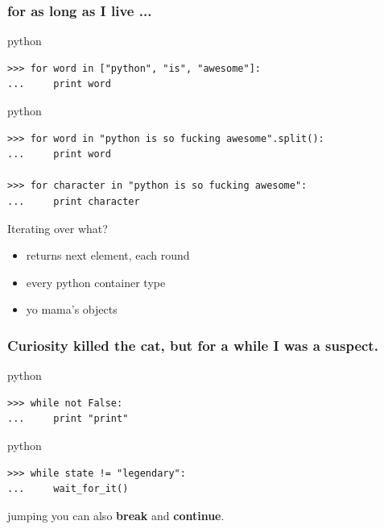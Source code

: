 \documentclass{beamer}
\begin{document}
\begin{frame}[fragile]
    \frametitle{\textbf{for} as long as I live ...}
    
    \begin{exampleblock}{python}
    \begin{lstlisting}
>>> for word in ["python", "is", "awesome"]:
...     print word
    \end{lstlisting}
    \end{exampleblock}

    \begin{exampleblock}{python}
    \begin{lstlisting}
>>> for word in "python is so fucking awesome".split():
...     print word

>>> for character in "python is so fucking awesome":
...     print character
    \end{lstlisting}
    \end{exampleblock}

	\pause

    \begin{block}{Iterating over what?}
    \begin{itemize}
    \item returns next element, each round
    \item every python container type
    \item yo mama's objects %
    \end{itemize}
    \end{block}
\end{frame}

\begin{frame}[fragile]
	\frametitle{Curiosity killed the cat, but for a \textbf{while} I was a suspect.} %

	\begin{exampleblock}{python}
	\begin{lstlisting}
>>> while not False:
...     print "print"
	\end{lstlisting}
	\end{exampleblock}
	
	\pause
	
	\begin{exampleblock}{python}
	\begin{lstlisting}
>>> while state != "legendary":
...     wait_for_it()
	\end{lstlisting}
	\end{exampleblock}

	\pause
	
	\begin{block}{jumping}
	you can also \textbf{break} and \textbf{continue}.
	\end{block}
\end{frame}
\end{document}
